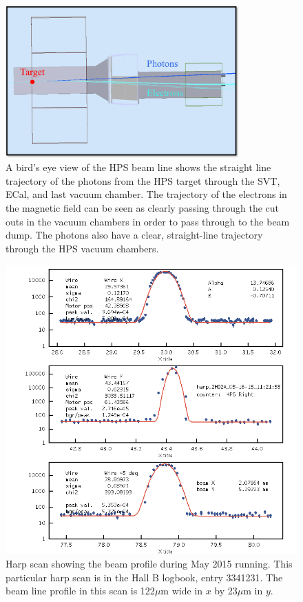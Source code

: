 \begin{figure}[htb]
  \centering
      \includegraphics[width=0.8\textwidth]{pics/experiment/beamlineGemc.png}
  \caption[HPS beamline simulation in GEMC]{A bird's eye view of the HPS beam line shows the straight line trajectory of the photons from the HPS target through the SVT, ECal, and last vacuum chamber. The trajectory of the electrons in the magnetic field can be seen as clearly passing through the cut outs in the vacuum chambers in order to pass through to the beam dump. The photons also have a clear, straight-line trajectory through the HPS vacuum chambers.}
  \label{Figure:gemc}
\end{figure}

\begin{figure}[H]
  \centering
      \includegraphics[width=1.0\textwidth]{pics/experiment/harpScan.png}
  \caption[Beam profile from harp scan during 2015 run]{Harp scan showing the beam profile during May 2015 running. This particular harp scan is in the Hall B logbook, entry 3341231. The beam line profile in this scan is 122$\mu$m wide in $x$ by 23$\mu$m in $y$.}
  \label{Figure:harpScan}
\end{figure}

